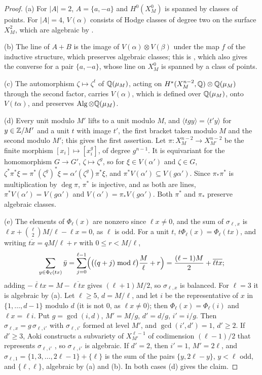 \begin{proof}
(a) For $|A|=2$, $A=\{a,-a\}$ and $H^{0}(X^{0}_{M})$ is spanned by classes of
points. For $|A|=4$, $V(\alpha)$ consists of Hodge classes of degree two on
the surface $X^{2}_{M}$, which are algebraic by .

(b) The line of $A+B$ is the image of $V(\alpha)\otimes V(\beta)$ under the
map $f$ of the inductive structure, which preserves algebraic classes; this
is \cite[Theorem~1-4]{Aok87}, which also gives the converse for a pair
$\{a,-a\}$, whose line on $X^{0}_{M}$ is spanned by a class of points.

(c) The automorphism $\zeta\mapsto\zeta^{t}$ of $\mathbb{Q}(\mu_{M})$, acting on
$H^{*}(X^{n-2}_{M},\mathbb{Q})\otimes\mathbb{Q}(\mu_{M})$ through the second factor,
carries $V(\alpha)$, which is defined over $\mathbb{Q}(\mu_{M})$, onto $V(t\alpha)$,
and preserves $\operatorname{Alg}\otimes\mathbb{Q}(\mu_{M})$.

(d) Every unit modulo $M'$ lifts to a unit modulo $M$, and
$\langle tgy\rangle=\langle t'y\rangle$ for $y\in\mathbb{Z}/M'$ and a unit $t$ with
image $t'$, the first bracket taken modulo $M$ and the second modulo $M'$;
this gives the first assertion. Let $\pi\colon X^{n-2}_{M}\to X^{n-2}_{M'}$
be the finite morphism $[x_{i}]\mapsto[x_{i}^{g}]$, of degree
$g^{n-1}$. It is equivariant for the homomorphism $G\to G'$,
$\zeta\mapsto\zeta^{g}$, so for $\xi\in V(\alpha')$ and $\zeta\in G$,
$\zeta^{*}\pi^{*}\xi=\pi^{*}(\zeta^{g})^{*}\xi=\alpha'(\zeta^{g})\pi^{*}\xi$,
and $\pi^{*}V(\alpha')\subseteq V(g\alpha')$. Since $\pi_{*}\pi^{*}$ is
multiplication by $\deg\pi$, $\pi^{*}$ is injective, and as both are lines,
$\pi^{*}V(\alpha')=V(g\alpha')$ and $V(\alpha')=\pi_{*}V(g\alpha')$. Both
$\pi^{*}$ and $\pi_{*}$ preserve algebraic classes.

(e) The elements of $\Phi_{\ell}(x)$ are nonzero since $\ell x\ne0$, and the
sum of $\sigma_{\ell,x}$ is $\ell x+\binom{\ell}{2}M/\ell-\ell x=0$, as $\ell$
is odd. For a unit $t$, $t\Phi_{\ell}(x)=\Phi_{\ell}(tx)$, and writing
$\overline{tx}=qM/\ell+r$ with $0\le r<M/\ell$,
\[
  \sum_{y\in\Phi_{\ell}(tx)}\bar y=\sum_{j=0}^{\ell-1}\Bigl(\bigl((q+j)\bmod
  \ell\bigr)\frac{M}{\ell}+r\Bigr)=\frac{(\ell-1)M}{2}+\overline{\ell tx};
\]
adding $\overline{-\ell tx}=M-\overline{\ell tx}$ gives $(\ell+1)M/2$, so
$\sigma_{\ell,x}$ is balanced. For $\ell=3$ it is algebraic by (a). Let
$\ell\ge5$, $d=M/\ell$, and let $i$ be the representative of $x$ in
$\{1,\dots,d-1\}$ modulo $d$ (it is not $0$, as $\ell x\ne0$); then
$\Phi_{\ell}(x)=\Phi_{\ell}(i)$ and $\ell x=\ell i$. Put $g=\gcd(i,d)$,
$M'=M/g$, $d'=d/g$, $i'=i/g$. Then $\sigma_{\ell,x}=g\,\sigma_{\ell,i'}$ with
$\sigma_{\ell,i'}$ formed at level $M'$, and $\gcd(i',d')=1$, $d'\ge2$. If
$d'\ge3$, Aoki constructs a subvariety of $X^{\ell-1}_{M'}$ of codimension
$(\ell-1)/2$ that represents $\sigma_{\ell,i'}$ \cite[Theorem~2-1]{Aok87}, so
$\sigma_{\ell,i'}$ is algebraic. If $d'=2$, then $i'=1$, $M'=2\ell$, and
$\sigma_{\ell,1}=\{1,3,\dots,2\ell-1\}+\{\ell\}$ is the sum of the pairs
$\{y,2\ell-y\}$, $y<\ell$ odd, and $\{\ell,\ell\}$, algebraic by (a) and (b).
In both cases (d) gives the claim.


\end{proof}

